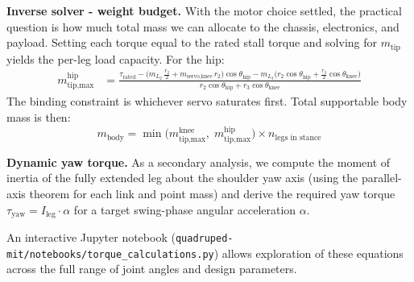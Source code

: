 \textbf{Inverse solver - weight budget.}
With the motor choice settled, the practical question is how much total mass
we can allocate to the chassis, electronics, and payload. Setting each torque
equal to the rated stall torque and solving for $m_{\text{tip}}$ yields the
per-leg load capacity.
For the hip:
%
\begin{align*}
  m_{\text{tip,max}}^{\text{hip}}
  &= \frac{
    \tau_{\text{rated}}
    - \bigl(m_{L_2}\,\tfrac{r_2}{2}
    + m_{\text{servo,knee}}\,r_2\bigr)\cos\theta_{\text{hip}}
    - m_{L_3}\bigl(r_2\cos\theta_{\text{hip}}
    + \tfrac{r_3}{2}\cos\theta_{\text{knee}}\bigr)
  }{
    r_2\cos\theta_{\text{hip}} + r_3\cos\theta_{\text{knee}}
  }
\end{align*}
%
The binding constraint is whichever servo saturates first.  Total supportable
body mass is then:
%
\[
  m_{\text{body}}
  = \min\!\bigl(m_{\text{tip,max}}^{\text{knee}},\;
  m_{\text{tip,max}}^{\text{hip}}\bigr)
  \times n_{\text{legs in stance}}
\]

\vspace{0.5cm}
\textbf{Dynamic yaw torque.}
As a secondary analysis, we compute the moment of inertia of the fully extended
leg about the shoulder yaw axis (using the parallel-axis theorem for each link
and point mass) and derive the required yaw torque
$\tau_{\text{yaw}} = I_{\text{leg}} \cdot \alpha$ for a target swing-phase
angular acceleration $\alpha$.

\vspace{0.5cm}
An interactive Jupyter notebook
(\texttt{quadruped-mit/notebooks/torque\_calculations.py}) allows exploration
of these equations across the full range of joint angles and design parameters.

